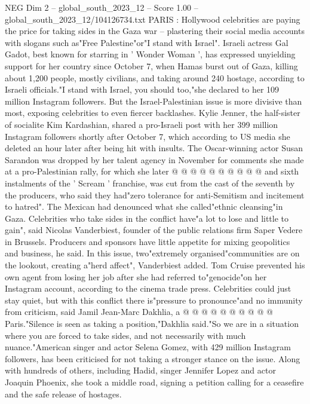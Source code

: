 \begin{textsample}{NEG Dim 2 – global\_south\_2023\_12 – Score 1.00 – global\_south\_2023\_12/104126734.txt}  \label{ex:f2_neg_426}
PARIS : Hollywood celebrities are paying the price for taking sides in the Gaza war -- plastering their social media accounts with slogans such as"Free Palestine"or"I stand with Israel".
Israeli actress Gal Gadot, best known for starring in ' Wonder Woman ', has expressed unyielding support for her country since October 7, when Hamas burst out of Gaza, killing about 1,200 people, mostly civilians, and taking around 240 hostage, according to Israeli officials."I stand with Israel, you should too,"she declared to her 109 million Instagram followers.
But the Israel-Palestinian issue is more divisive than most, exposing celebrities to even fiercer backlashes.
Kylie Jenner, the half-sister of socialite Kim Kardashian, shared a pro-Israeli post with her 399 million Instagram followers shortly after October 7, which according to US media she deleted an hour later after being hit with insults.
The Oscar-winning actor Susan Sarandon was dropped by her talent agency in November for comments she made at a pro-Palestinian rally, for which she later @ @ @ @ @ @ @ @ @ @ and sixth instalments of the ' Scream ' franchise, was cut from the cast of the seventh by the producers, who said they had"zero tolerance for anti-Semitism and incitement to hatred".
The Mexican had denounced what she called"ethnic cleansing"in Gaza.
Celebrities who take sides in the conflict have"a lot to lose and little to gain", said Nicolas Vanderbiest, founder of the public relations firm Saper Vedere in Brussels.
Producers and sponsors have little appetite for mixing geopolitics and business, he said.
In this issue, two"extremely organised"communities are on the lookout, creating a"herd affect", Vanderbiest added.
Tom Cruise prevented his own agent from losing her job after she had referred to"genocide"on her Instagram account, according to the cinema trade press.
Celebrities could just stay quiet, but with this conflict there is"pressure to pronounce"and no immunity from criticism, said Jamil Jean-Marc Dakhlia, a @ @ @ @ @ @ @ @ @ @ Paris."Silence is seen as taking a position,"Dakhlia said."So we are in a situation where you are forced to take sides, and not necessarily with much nuance."American singer and actor Selena Gomez, with 429 million Instagram followers, has been criticised for not taking a stronger stance on the issue.
Along with hundreds of others, including Hadid, singer Jennifer Lopez and actor Joaquin Phoenix, she took a middle road, signing a petition calling for a ceasefire and the safe release of hostages.

\end{textsample}

